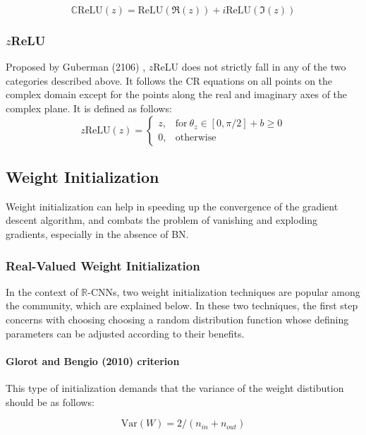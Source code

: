 \begin{equation}
\label{eqcrelu}
\mathbb{C}\mathrm{ReLU}(z) = \mathrm{ReLU}(\Re(z))+i\mathrm{ReLU}(\Im(z))
\end{equation}

 
 
 \subsubsection{$z$ReLU}
 Proposed by Guberman (2106) \cite{Guberman}, $z$ReLU does not strictly fall in any of the two categories described above. It follows the CR equations on all points on the complex domain except for the points along the real and imaginary axes of the complex plane. It is defined as follows:
  \begin{equation}
  \label{eqzrelu}
 z\mathrm{ReLU}(z) 
 {}=\begin{cases} z , &\mathrm{for} \ \theta_{z} \in [0,\pi/2] + b\ge 0 \\ 0 , &\textrm{otherwise} \end{cases}
 \end{equation}

 \subsection{Weight Initialization}
 Weight initialization can help in speeding up the convergence of the gradient descent algorithm, and combats the problem of vanishing and exploding gradients, especially in the absence of BN. 
 
 
 \subsubsection{Real-Valued Weight Initialization}\label{rvwi}
 In the context of $\mathbb{R}$-CNNs, two weight initialization techniques are popular among the community, which are explained below. In these two techniques, the first step concerns with choosing choosing a random distribution function whose defining parameters can be adjusted according to their benefits.
 \paragraph{Glorot and Bengio (2010) criterion}
 This type of initialization demands that the variance of the weight distibution should be as follows:

  \begin{equation}\label{gbwi}
\mathrm{Var}(W) = 2/(n_{in}+n_{out})
\end{equation}
 
